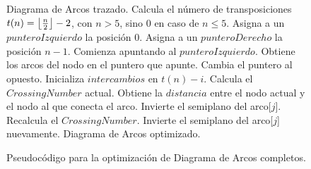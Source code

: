 	\begin{figure}
	    \begin{center}
		\begin{algorithmic}[1]
			\REQUIRE Diagrama de Arcos trazado.
			\STATE Calcula el número de transposiciones $t(n) = \floor*{\frac{n}{2}}-2$, con $n > 5$, sino $0$ en caso de $n \leq 5$.
			\STATE Asigna a un $punteroIzquierdo$ la posición 0.
			\STATE Asigna a un $punteroDerecho$ la posición $n-1$.
			\STATE Comienza apuntando al $punteroIzquierdo$.
			\STATE Obtiene los arcos del nodo en el puntero que apunte.
			\STATE Cambia el puntero al opuesto.
			\STATE Inicializa $intercambios$ en $t(n)-i$.
			\STATE Calcula el $CrossingNumber$ actual.
			\STATE Obtiene la $distancia$ entre el nodo actual y el nodo al que conecta el arco.
			\STATE Invierte el semiplano del arco[$j$].
			\STATE Recalcula el $CrossingNumber$.
			\STATE Invierte el semiplano del arco[$j$] nuevamente.
			\ENDIF
			\ENDIF
			\ENDWHILE
			\ENDFOR
			\ENSURE Diagrama de Arcos optimizado.
		\end{algorithmic}
	    \end{center}

		\caption{Pseudocódigo para la optimización de Diagrama de Arcos completos.}
		\label{alg:arcdiagram_optimizado}
	\end{figure}
	
